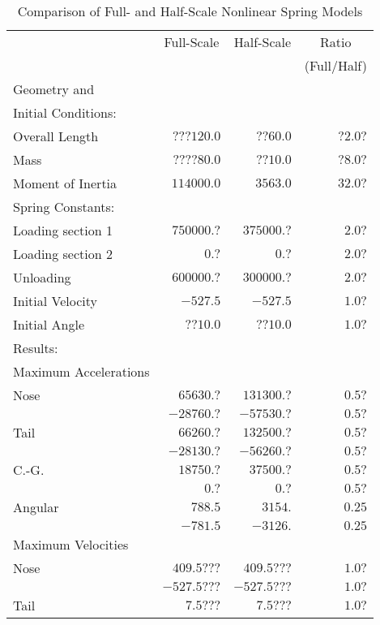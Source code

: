 \begin{table}
\begin{center}
\caption{Comparison of Full- and Half-Scale Nonlinear Spring Models}
\makeqnum
\begin{tabular}{||l|r|r|r||}
\hline
 &\multicolumn{1}{|c}{Full-Scale}
 &\multicolumn{1}{|c}{Half-Scale}
 &\multicolumn{1}{|c||}{Ratio}\\
 & & &\multicolumn{1}{|c||}{(Full/Half)}\\
Geometry and & & & \\
Initial Conditions: & & & \\
\quad Overall Length     &$???120.0$ &$??60.0$ &$?2.0?$\\
\quad Mass               &$????80.0$ &$??10.0$ &$?8.0?$\\
\quad Moment of Inertia  &$114000.0$ &$3563.0$ &$32.0?$\\
\quad Spring Constants: & & &\\
\quad \quad Loading section 1   &$750000.?$ &$375000.?$ &$2.0?$\\
\quad \quad Loading section 2   &$     0.?$ &$     0.?$ &$2.0?$\\
\quad \quad Unloading           &$600000.?$ &$300000.?$ &$2.0?$\\
\quad Initial Velocity  &$-527.5$ &$-527.5$ &$1.0?$\\
\quad Initial Angle     &$??10.0$ &$??10.0$ &$1.0?$\\
\hline
Results: & & & \\
Maximum Accelerations & & & \\
\quad    Nose    &$65630.?$ &$131300.?$ &$0.5?$\\
            &$-28760.?$ &$-57530.?$ &$0.5?$\\
\quad    Tail    &$66260.?$ &$132500.?$ &$0.5?$\\
            &$-28130.?$ &$-56260.?$ &$0.5?$\\
\quad    C.-G.   &$18750.?$ &$37500.?$ &$0.5?$\\
            &$0.?$    &$0.?$    &$0.5?$\\
\quad    Angular &$788.5$  &$3154.$  &$0.25$\\
            &$-781.5$ &$-3126.$ &$0.25$\\
Maximum Velocities & & & \\
\quad    Nose &$409.5???$ &$409.5???$ &$1.0?$\\
         &$-527.5???$ &$-527.5???$ &$1.0?$\\
\quad    Tail &$7.5???$ &$7.5???$ &$1.0?$\\

\end{tabular}
\end{center}
\end{table}
